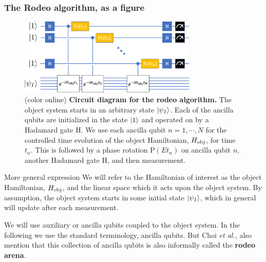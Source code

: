 \documentclass{beamer}
\begin{document}
\begin{frame}
\frametitle{The Rodeo algorithm, as a figure}

\begin{figure}
\centering
\includegraphics[width=8.5cm]{rodeofigs/rodeo_circuit.png}
\caption{(color online) {\bf Circuit diagram for the rodeo algorithm.} The object system starts in an arbitrary state $\ket{\psi_I}$.  Each of the ancilla qubits are initialized in the state $\ket{1}$ and operated on by a Hadamard gate H.  We use each ancilla qubit $n=1, \cdots, N$ for the controlled time evolution of the object Hamiltonian, $H_{\rm obj}$, for time $t_n$.  This is followed by a phase rotation P$(Et_n)$ on ancilla qubit $n$, another Hadamard gate H, and then measurement.}
\label{rodeo_circuit}
\end{figure} 

\end{frame}

\begin{frame}{More general expression}
We will refer to the Hamiltonian of interest as the object
Hamiltonian, $H_{\rm obj}$, and the linear space which it acts upon
the object system. By assumption, the object system starts in some
initial state $\ket{\psi_I}$, which in general will update after each
measurement.

We will use auxiliary or ancilla qubits coupled to the
object system.  In the following we use the standard terminology,
ancilla qubits. But Choi {\em et al.,} also mention that this collection of ancilla
qubits is also informally called the {\bf rodeo arena}.

\end{frame}
\end{document}
